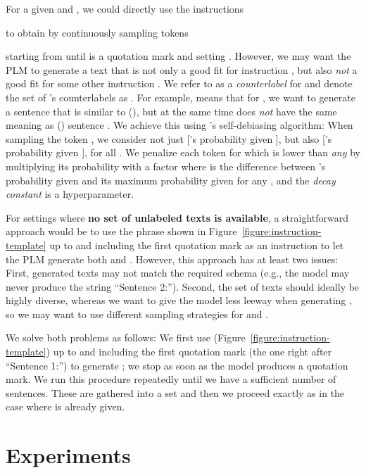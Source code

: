 \documentclass[11pt]{article}
\begin{document}
For a given  and , we could
directly use the  instructions

to obtain  by continuously sampling tokens

starting from  until  is a quotation mark and
setting . However, we
may want the PLM to generate a text  that is
not only a good fit for instruction , but
also
\emph{not} a good fit for some other
instruction . We refer to
 as a \emph{counterlabel} for 
and denote the set of 's counterlabels  as
. For example,  means that
for , we want  to generate a sentence
 that is similar to (), but at
the same time does \emph{not}
have the same meaning as () sentence
. We achieve this using
\citet{schick2021selfdiagnosis}'s self-debiasing algorithm:
When sampling the token , we consider not just 
['s  probability given ], but also
 ['s probability given ], for all . We penalize each token  for which  is lower than \emph{any}  by multiplying its probability with a factor
 where 
 is the difference between 's probability given  and its maximum probability given  for any , and the \emph{decay constant}  is a hyperparameter.

For settings where \textbf{no set of unlabeled texts  is
available}, a straightforward approach would be to use the
phrase shown in Figure~\ref{figure:instruction-template} up
to and including the first quotation mark as an instruction
to let the PLM generate both  and
. However, this approach has at least two
issues: First, generated texts may not match the required schema
(e.g., the
model may never produce the string ``Sentence 2:''). Second,
the set of texts  should ideally be highly
diverse, whereas we want to give the model less leeway when
generating , so
we may want to use different sampling strategies for
 and .

We solve both problems as follows: We first use 
(Figure~\ref{figure:instruction-template}) up to and
including the first quotation mark
(the one right after ``Sentence 1:'')
to generate
; we stop as soon as the model produces a
quotation mark.
We run this procedure repeatedly until we have a sufficient
number of sentences. These are gathered into
a set  and then we proceed exactly as in the case where 
is already given.

\section{Experiments}
\end{document}
